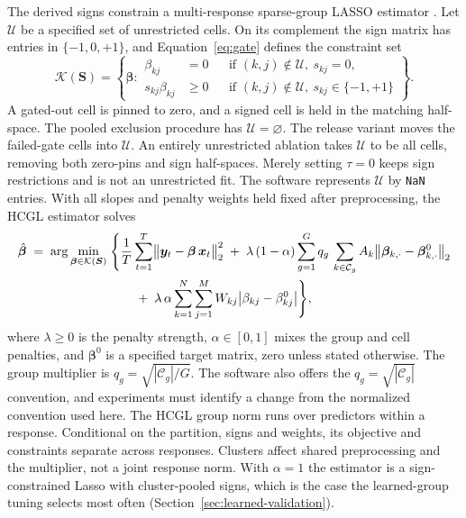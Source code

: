 \documentclass[lineno,pdflatex,sn-basic]{sn-jnl}
\theoremstyle{thmstyleone}
\begin{document}
The derived signs constrain a multi-response sparse-group LASSO estimator
\citep{Simon+etal:2013}. Let $\mathcal U$ be a specified set of unrestricted
cells. On its complement the sign matrix has entries in $\{-1,0,+1\}$, and
Equation~\eqref{eq:gate} defines the constraint set
%
\begin{equation} \label{eq:sgl-sign-constraint}
	\mathcal{K}(\bm{S}) =
	\left\{\bm{\beta} :
	\begin{aligned}
	 \beta_{kj} &= 0 &&\text{if } (k,j)\notin\mathcal U,\ s_{kj}=0,\\
	 s_{kj}\beta_{kj} &\geq0 &&\text{if } (k,j)\notin\mathcal U,\
	 s_{kj}\in\{-1,+1\}
	\end{aligned}\right\}.
\end{equation}
%
A gated-out cell is pinned to zero, and a signed cell is held in the matching
half-space. The pooled exclusion procedure has $\mathcal U=\varnothing$. The
release variant moves the failed-gate cells into $\mathcal U$. An entirely
unrestricted ablation takes $\mathcal U$ to be all cells, removing both zero-pins
and sign half-spaces. Merely setting $\tau=0$ keeps sign restrictions and is not
an unrestricted fit. The software represents $\mathcal U$ by \texttt{NaN}
entries. With all slopes and penalty weights held fixed after preprocessing,
the HCGL estimator solves
%
\begin{align}
	\hat{\bm{\beta}} \;=\; \arg\min_{\bm{\beta} \in \mathcal{K}(\bm{S})} \;&
	\Biggl\{
	\frac{1}{T} \sum_{t = 1}^{T}
	\bigl\| \bm{y}_{t} - \bm{\beta}\, \bm{x}_{t} \bigr\|_2^2
	\;+\; \lambda\, (1 - \alpha) \sum_{g = 1}^{G} q_g\,
	\sum_{k \in \mathcal{C}_g} A_k
	\bigl\| \bm{\beta}_{k, \cdot} - \bm{\beta}^{0}_{k, \cdot} \bigr\|_2
	\notag \\
	& \qquad +\; \lambda\, \alpha \sum_{k = 1}^{N} \sum_{j = 1}^{M} W_{kj}
	\bigl| \beta_{kj} - \beta^{0}_{kj} \bigr|
	\Biggr\}, \label{eq:sgl-sign}
\end{align}
%
where $\lambda\geq0$ is the penalty strength, $\alpha\in[0,1]$ mixes the group
and cell penalties, and $\bm\beta^0$ is a specified target matrix, zero unless
stated otherwise. The group multiplier is
$q_g=\sqrt{|\mathcal C_g|/G}$. The software also offers the
$q_g=\sqrt{|\mathcal C_g|}$ convention, and experiments must identify a change
from the normalized convention used here. The HCGL group norm runs over
predictors within a response. Conditional on the partition, signs and weights,
its objective and constraints separate across responses. Clusters affect
shared preprocessing and the multiplier, not a joint response norm. With
$\alpha=1$ the estimator is a sign-constrained Lasso \citep{Tibshirani:1996}
with cluster-pooled signs, which is the case the learned-group tuning selects
most often (Section~\ref{sec:learned-validation}).
\end{document}
